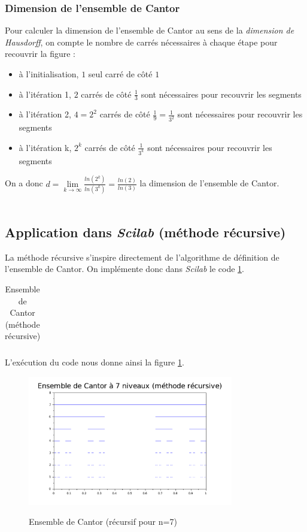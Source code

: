 \documentclass[a4paper,10pt]{report}
\begin{document}
\subsubsection{Dimension de l'ensemble de Cantor}
Pour calculer la dimension de l'ensemble de Cantor au sens de la \textit{dimension de Hausdorff}, on compte le nombre de carrés nécessaires à chaque étape pour recouvrir la figure :
\begin{itemize}
\item à l'initialisation, $1$ seul carré de côté $1$
\item à l'itération 1, $2$ carrés de côté $\frac{1}{3}$ sont nécessaires pour recouvrir les segments
\item à l'itération 2, $4=2^2$ carrés de côté $\frac{1}{9} = \frac{1}{3^2}$ sont nécessaires pour recouvrir les segments
\item à l'itération k, $2^k$ carrés de côté $\frac{1}{3^k}$ sont nécessaires pour recouvrir les segments
\end{itemize}
On a donc $d=\lim\limits_{k \rightarrow \infty} \frac{ln(2^k)}{ln(3^k)}=\frac{ln(2)}{ln(3)}$ la dimension de l'ensemble de Cantor.
\\ \\

\subsection{Application dans \textit{Scilab} (méthode récursive)}
La méthode récursive s'inspire directement de l'algorithme de définition de l'ensemble de Cantor. On implémente donc dans \textit{Scilab} le code \ref{code_cantor}.
\begin{table}[H]
\caption{Ensemble de Cantor (méthode récursive)}
\begin{tabular}{l}
\\
\end{tabular}
\label{code_cantor}
\end{table}
L'exécution du code nous donne ainsi la figure \ref{cantor_recursif}.
\begin{center}
\begin{figure}[H]
\centering
\caption{Ensemble de Cantor (récursif pour n=7)}
\includegraphics[width=0.8\textwidth]{cantor_recursif.pdf}
\label{cantor_recursif}
\end{figure}
\end{center}
\end{document}
